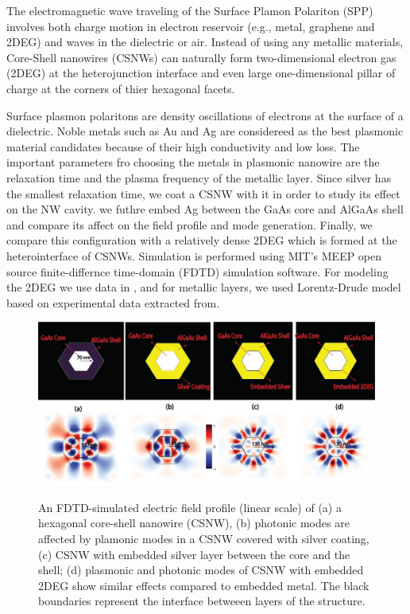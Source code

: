 The electromagnetic wave traveling of the Surface Plamon Polariton (SPP)
involves both charge motion in electron reservoir (e.g., metal, graphene and
2DEG) and waves in the dielectric or air. Instead of using any metallic
materials, Core-Shell nanowires (CSNWs) can naturally form two-dimensional
electron gas (2DEG) at the heterojunction interface and even large
one-dimensional pillar of charge at the corners of thier hexagonal facets.

Surface plasmon polaritons are density oscillations of electrons at the surface
of a dielectric. Noble metals such as Au and Ag are considereed as the best
plasmonic material candidates because of their high conductivity and low loss.
The important parameters fro choosing the metals in plasmonic nanowire are the
relaxation time and the plasma frequency of the metallic layer. Since silver
has the smallest relaxation time, we coat a CSNW with it in order to study its
effect on the NW cavity. we futhre embed Ag between the GaAs core and AlGaAs
shell and compare its affect on the field profile and mode generation. Finally,
we compare this configuration with a relatively dense 2DEG which is formed at
the heterointerface of CSNWs. Simulation is performed using MIT's MEEP open
source finite-differnce time-domain (FDTD) simulation software.  For modeling
the 2DEG we use data in , and for metallic layers, we used Lorentz-Drude model
based on experimental data extracted from.

\begin{figure}
  \caption{An FDTD-simulated electric field profile (linear scale) of (a) a hexagonal core-shell nanowire (CSNW), (b) photonic modes are affected by plamonic modes in a CSNW covered with silver coating, (c) CSNW with embedded silver layer between the core and the shell; (d) plasmonic and photonic modes of CSNW with embedded 2DEG show similar effects compared to embedded metal. The black boundaries represent the interface betweeen layers of the structure.}
  \centering
  \includegraphics[width=\textwidth]{pictures/Conclusion/PlasmonMode}
  \label{PlasmonMode}
\end{figure}

